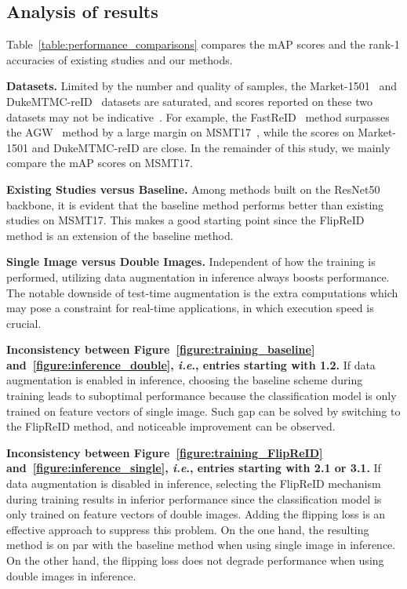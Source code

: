 \documentclass{article}
\def\onedot{.}
\def\ie{\emph{i.e}\onedot} \def\Ie{\emph{I.e}\onedot}
\begin{document}
\subsection{Analysis of results}

Table~\ref{table:performance_comparisons} compares the mAP scores and the rank-1 accuracies of existing studies and our methods.

\noindent\textbf{Datasets.}
Limited by the number and quality of samples, the Market-1501~\cite{zheng2015scalable} and DukeMTMC-reID~\cite{ristani2016performance} datasets are saturated, and scores reported on these two datasets may not be indicative~\cite{ni2021adaptive}.
For example, the FastReID~\cite{he2020fastreid} method surpasses the AGW~\cite{ye2020deep} method by a large margin on MSMT17~\cite{wei2018person}, while the scores on Market-1501 and DukeMTMC-reID are close.
In the remainder of this study, we mainly compare the mAP scores on MSMT17.

\noindent\textbf{Existing Studies versus Baseline.}
Among methods built on the ResNet50~\cite{he2016deep} backbone, it is evident that the baseline method performs better than existing studies on MSMT17.
This makes a good starting point since the FlipReID method is an extension of the baseline method.

\noindent\textbf{Single Image versus Double Images.}
Independent of how the training is performed, utilizing data augmentation in inference always boosts performance.
The notable downside of test-time augmentation is the extra computations which may pose a constraint for real-time applications, in which execution speed is crucial.

\noindent\textbf{Inconsistency between Figure~\ref{figure:training_baseline} and~\ref{figure:inference_double}, \ie, entries starting with 1.2.}
If data augmentation is enabled in inference, choosing the baseline scheme during training leads to suboptimal performance because the classification model is only trained on feature vectors of single image.
Such gap can be solved by switching to the FlipReID method, and noticeable improvement can be observed.

\noindent\textbf{Inconsistency between Figure~\ref{figure:training_FlipReID} and~\ref{figure:inference_single}, \ie, entries starting with 2.1 or 3.1.}
If data augmentation is disabled in inference, selecting the FlipReID mechanism during training results in inferior performance since the classification model is only trained on feature vectors of double images.
Adding the flipping loss is an effective approach to suppress this problem.
On the one hand, the resulting method is on par with the baseline method when using single image in inference.
On the other hand, the flipping loss does not degrade performance when using double images in inference.
\end{document}
